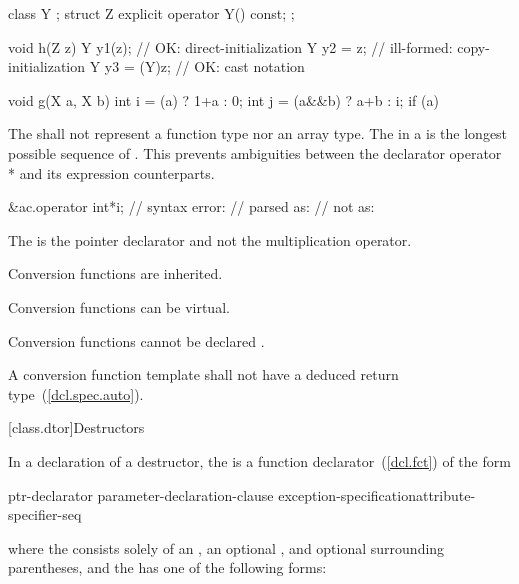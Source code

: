\begin{codeblock}
class Y { };
struct Z {
  explicit operator Y() const;
};

void h(Z z) {
  Y y1(z);          // OK: direct-initialization
  Y y2 = z;         // ill-formed: copy-initialization
  Y y3 = (Y)z;      // OK: cast notation
}

void g(X a, X b) {
  int i = (a) ? 1+a : 0;
  int j = (a&&b) ? a+b : i;
  if (a) {
  }
}
\end{codeblock}
\exitexample

\pnum
The
shall not represent a function type nor an array type.
The
in a
is the longest possible sequence of
.
\enternote
This prevents ambiguities between the declarator operator * and its expression
counterparts.
\enterexample

\begin{codeblock}
&ac.operator int*i; // syntax error:
                    // parsed as: 
                    // not as: 
\end{codeblock}

The \tcode{*} is the pointer declarator and not the multiplication operator.
\exitexample
\exitnote

\pnum
{}%
Conversion functions are inherited.

\pnum
{}%
Conversion functions can be virtual.

\pnum
{}%
Conversion functions cannot be declared
.

\pnum
{}%
A conversion function template shall not have a
deduced return type~(\ref{dcl.spec.auto}).

[class.dtor]{Destructors}%

\pnum
In a declaration of a destructor, the  is a
function declarator~(\ref{dcl.fct}) of the form

\begin{ncbnf}
ptr-declarator \terminal{(} parameter-declaration-clause \terminal{)} exception-specification\opt attribute-specifier-seq\opt
\end{ncbnf}

where the  consists solely of an
, an optional ,
and optional surrounding parentheses, and the  has
one of the following forms:

